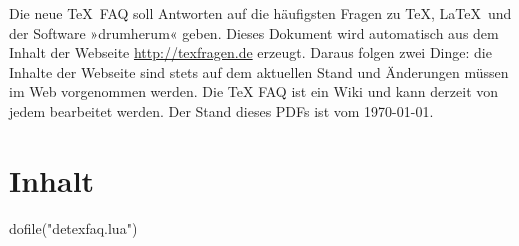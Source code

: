 \documentclass[a4paper,ngerman,fontsize=10bp]{scrartcl}
\begin{document}
\RaggedRight
\sloppy

Die neue \TeX\ FAQ soll Antworten auf die häufigsten Fragen zu \TeX, \LaTeX\ und der Software »drumherum« geben. Dieses Dokument wird automatisch aus dem Inhalt der Webseite \url{http://texfragen.de} erzeugt. Daraus folgen zwei Dinge: die Inhalte der Webseite sind stets auf dem aktuellen Stand und Änderungen müssen im Web vorgenommen werden. Die TeX FAQ ist ein Wiki und kann derzeit von jedem bearbeitet werden. Der Stand dieses PDFs ist vom \today.

\section{Inhalt}
\begin{luacode*}
dofile("detexfaq.lua")
\end{luacode*}
\end{document}
